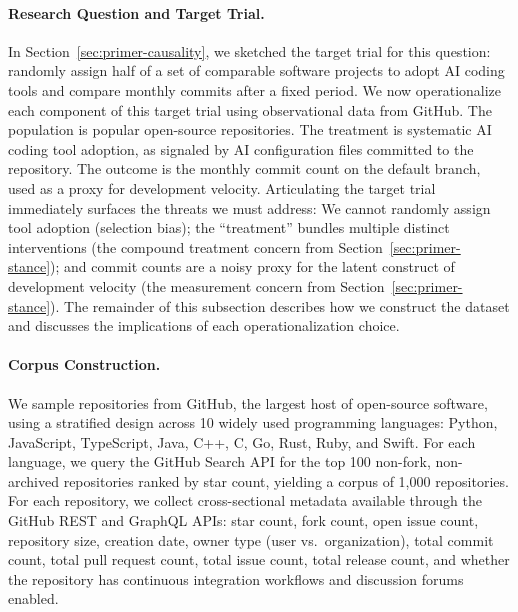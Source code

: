 \paragraph{Research Question and Target Trial.}
In Section~\ref{sec:primer-causality}, we sketched the target trial for this question: randomly assign half of a set of comparable software projects to adopt AI coding tools and compare monthly commits after a fixed period.
We now operationalize each component of this target trial using observational data from GitHub.
The population is popular open-source repositories.
The treatment is systematic AI coding tool adoption, as signaled by AI configuration files committed to the repository.
The outcome is the monthly commit count on the default branch, used as a proxy for development velocity.
Articulating the target trial immediately surfaces the threats we must address: We cannot randomly assign tool adoption (selection bias); the ``treatment'' bundles multiple distinct interventions (the compound treatment concern from Section~\ref{sec:primer-stance}); and commit counts are a noisy proxy for the latent construct of development velocity (the measurement concern from Section~\ref{sec:primer-stance}).
The remainder of this subsection describes how we construct the dataset and discusses the implications of each operationalization choice.

\paragraph{Corpus Construction.}
We sample repositories from GitHub, the largest host of open-source software, using a stratified design across 10 widely used programming languages: Python, JavaScript, TypeScript, Java, C++, C, Go, Rust, Ruby, and Swift.
For each language, we query the GitHub Search API for the top 100 non-fork, non-archived repositories ranked by star count, yielding a corpus of 1,000 repositories.
For each repository, we collect cross-sectional metadata available through the GitHub REST and GraphQL APIs: star count, fork count, open issue count, repository size, creation date, owner type (user vs.\ organization), total commit count, total pull request count, total issue count, total release count, and whether the repository has continuous integration workflows and discussion forums enabled.


